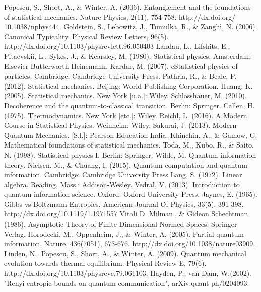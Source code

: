 \documentclass[11pt]{book}
\theoremstyle{definition}
\begin{document}
\begin{thebibliography}{10}
 Popescu, S., Short, A., \& Winter, A. (2006). Entanglement and the foundations of statistical mechanics. Nature Physics, 2(11), 754-758. http://dx.doi.org/ 10.1038/nphys444.
 Goldstein, S., Lebowitz, J., Tumulka, R., \& Zanghì, N. (2006). Canonical Typicality. Physical Review Letters, 96(5). http://dx.doi.org/10.1103/physrevlett.96.050403
 Landau, L., Lifshits, E., Pitaevskii, L., Sykes, J., \& Kearsley, M. (1980). Statistical physics. Amsterdam: Elsevier Butterworth Heinemann.
Kardar, M. (2007). cStatistical physics of particles. Cambridge: Cambridge University Press.
Pathria, R., \& Beale, P. (2012). Statistical mechanics. Beijing: World Publishing Corporation.
Huang, K. (2005). Statistical mechanics. New York [u.a.]: Wiley.
Schlosshauer, M. (2010). Decoherence and the quantum-to-classical transition. Berlin: Springer.
Callen, H. (1975). Thermodynamics. New York [etc.]: Wiley.
Reichl, L. (2016). A Modern Course in Statistical Physics. Weinheim: Wiley.
Sakurai, J. (2013). Modern Quantum Mechanics. [S.l.]: Pearson Education India.
Khinchin, A., \& Gamow, G. Mathematical foundations of statistical mechanics.
Toda, M., Kubo, R., \& Saito, N. (1998). Statistical physics I. Berlin: Springer.
Wilde, M. Quantum information theory.
 Nielsen, M., \& Chuang, I. (2015). Quantum computation and quantum information. Cambridge: Cambridge University Press
Lang, S. (1972). Linear algebra. Reading, Mass.: Addison-Wesley.
Vedral, V. (2013). Introduction to quantum information science. Oxford: Oxford University Press.
Jaynes, E. (1965). Gibbs vs Boltzmann Entropies. American Journal Of Physics, 33(5), 391-398. http://dx.doi.org/10.1119/1.1971557
Vitali D. Milman., \& Gideon Schechtman. (1986). Asymptotic Theory of Finite Dimensional Normed Spaces. Springer Verlag.
Horodecki, M., Oppenheim, J., \& Winter, A. (2005). Partial quantum information. Nature, 436(7051), 673-676. http://dx.doi.org/10.1038/nature03909.
Linden, N., Popescu, S., Short, A., \& Winter, A. (2009). Quantum mechanical evolution towards thermal equilibrium. Physical Review E, 79(6). http://dx.doi.org/10.1103/physreve.79.061103.
Hayden, P., van Dam, W.(2002). "Renyi-entropic bounds on quantum communication", arXiv:quant-ph/0204093.

\end{thebibliography}



 
\end{document}

